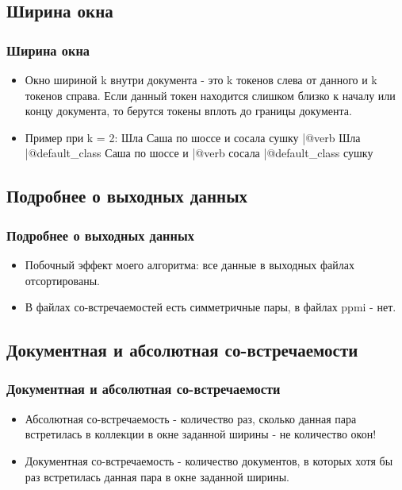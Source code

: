 \documentclass{beamer}
\begin{document}

\subsection{Ширина окна}

\begin{frame}
\frametitle{Ширина окна}
\begin{itemize}
\item Окно шириной k внутри документа - это k токенов слева от данного и k токенов справа. Если данный токен находится слишком близко к началу или концу документа, то берутся токены вплоть до границы документа.
\item Пример при k = 2:
\newline
\newline
Шла \color{green} Саша по \color{red} шоссе \color{green} и сосала \color{black} сушку
\newline
\newline
|@verb Шла |@default\_class Саша \color{green} по шоссе \color{red} и \color{black} |@verb сосала |@default\_class \color{green} сушку
\end{itemize}
\end{frame}


\subsection{Подробнее о выходных данных}

\begin{frame}
\frametitle{Подробнее о выходных данных}
\begin{itemize}
\item Побочный эффект моего алгоритма: все данные в выходных файлах отсортированы.
\item В файлах со-встречаемостей есть симметричные пары, в файлах ppmi - нет.
\end{itemize}
\end{frame}


\subsection{Документная и абсолютная со-встречаемости}

\begin{frame}
\frametitle{Документная и абсолютная со-встречаемости}
\begin{itemize}
\item Абсолютная со-встречаемость - количество раз, сколько данная пара встретилась в коллекции в окне заданной ширины - не количество окон!
\item Документная со-встречаемость - количество документов, в которых хотя бы раз встретилась данная пара в окне заданной ширины.
\end{itemize}
\end{frame}
\end{document}
